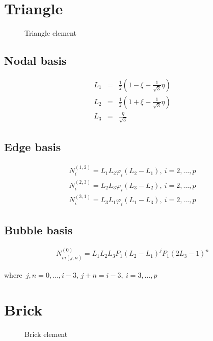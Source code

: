 \section{Triangle}

\begin{figure}[tbhp]
\begin{center}

\caption{Triangle element}
\end{center}
\end{figure}

\subsection{Nodal basis}

\begin{eqnarray*}
L_1&=&\frac{1}{2}(1-\xi-\frac{1}{\sqrt{3}}\eta) \\
L_2&=&\frac{1}{2}(1+\xi-\frac{1}{\sqrt{3}}\eta) \\
L_3&=&\frac{\eta}{\sqrt{3}}
\end{eqnarray*}

\subsection{Edge basis}

\begin{eqnarray*}
N_i^{(1,2)}=L_1L_2\varphi_i(L_2-L_1),\ i=2,\ldots,p \\
N_i^{(2,3)}=L_2L_3\varphi_i(L_3-L_2),\ i=2,\ldots,p \\
N_i^{(3,1)}=L_3L_1\varphi_i(L_1-L_3),\ i=2,\ldots,p
\end{eqnarray*}

\subsection{Bubble basis}

\begin{eqnarray*}
N_{m(j,n)}^{(0)}=L_1L_2L_3 P_{1}(L_2-L_1)^{j}P_{1}(2L_3-1)^{n}
\end{eqnarray*}

\noindent where\ $j,n=0,\ldots,i-3$, $j+n=i-3,\ i=3,\ldots,p$

\section{Brick}

\begin{figure}[tbhp]
\begin{center}

\caption{Brick element}
\end{center}
\end{figure}

